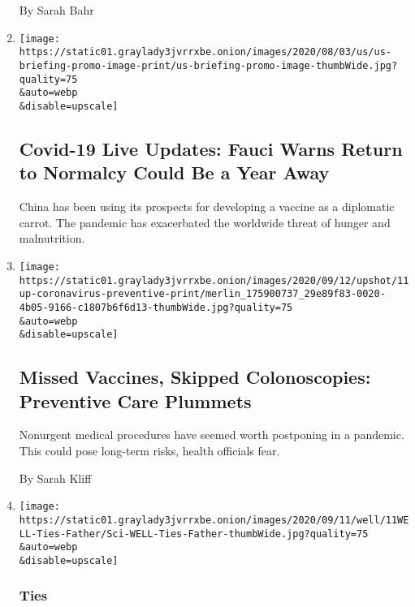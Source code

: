 \begin{enumerate}
  By Sarah Bahr
\item
  \href{/2020/09/11/world/covid-19-coronavirus.html}{}

  \texttt{[image: https://static01.graylady3jvrrxbe.onion/images/2020/08/03/us/us-briefing-promo-image-print/us-briefing-promo-image-thumbWide.jpg?quality=75\\\&auto=webp\\\&disable=upscale]}

  \hypertarget{covid-19-live-updates-fauci-warns-return-to-normalcy-could-be-a-year-away}{%
  \subsection{Covid-19 Live Updates: Fauci Warns Return to Normalcy
  Could Be a Year
  Away}\label{covid-19-live-updates-fauci-warns-return-to-normalcy-could-be-a-year-away}}

  China has been using its prospects for developing a vaccine as a
  diplomatic carrot. The pandemic has exacerbated the worldwide threat
  of hunger and malnutrition.
\item
  \href{/2020/09/11/upshot/pandemic-decline-preventive-care.html}{}

  \texttt{[image: https://static01.graylady3jvrrxbe.onion/images/2020/09/12/upshot/11up-coronavirus-preventive-print/merlin\_175900737\_29e89f83-0020-4b05-9166-c1807b6f6d13-thumbWide.jpg?quality=75\\\&auto=webp\\\&disable=upscale]}

  \hypertarget{missed-vaccines-skipped-colonoscopies-preventive-care-plummets}{%
  \subsection{Missed Vaccines, Skipped Colonoscopies: Preventive Care
  Plummets}\label{missed-vaccines-skipped-colonoscopies-preventive-care-plummets}}

  Nonurgent medical procedures have seemed worth postponing in a
  pandemic. This could pose long-term risks, health officials fear.

  By Sarah Kliff
\item
  \href{/2020/09/11/well/family/father-daughter-family-connections.html}{}

  \texttt{[image: https://static01.graylady3jvrrxbe.onion/images/2020/09/11/well/11WELL-Ties-Father/Sci-WELL-Ties-Father-thumbWide.jpg?quality=75\\\&auto=webp\\\&disable=upscale]}

  \hypertarget{ties}{%
  \subsubsection{Ties}\label{ties}}


\end{enumerate}
